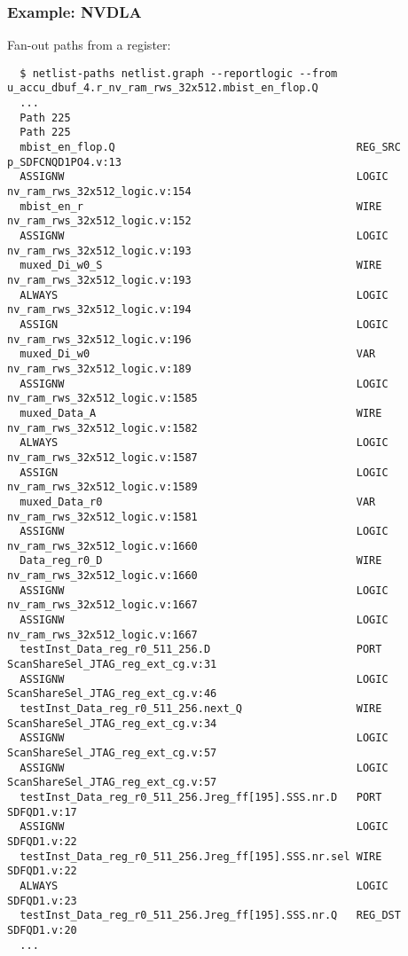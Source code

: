 \documentclass[professionalfonts]{beamer}
\begin{document}
\begin{frame}[fragile]
  \frametitle{Example: NVDLA}
  Fan-out paths from a register:
  \tiny
  \begin{verbatim}
  $ netlist-paths netlist.graph --reportlogic --from u_accu_dbuf_4.r_nv_ram_rws_32x512.mbist_en_flop.Q
  ...
  Path 225
  Path 225
  mbist_en_flop.Q                                      REG_SRC p_SDFCNQD1PO4.v:13
  ASSIGNW                                              LOGIC   nv_ram_rws_32x512_logic.v:154
  mbist_en_r                                           WIRE    nv_ram_rws_32x512_logic.v:152
  ASSIGNW                                              LOGIC   nv_ram_rws_32x512_logic.v:193
  muxed_Di_w0_S                                        WIRE    nv_ram_rws_32x512_logic.v:193
  ALWAYS                                               LOGIC   nv_ram_rws_32x512_logic.v:194
  ASSIGN                                               LOGIC   nv_ram_rws_32x512_logic.v:196
  muxed_Di_w0                                          VAR     nv_ram_rws_32x512_logic.v:189
  ASSIGNW                                              LOGIC   nv_ram_rws_32x512_logic.v:1585
  muxed_Data_A                                         WIRE    nv_ram_rws_32x512_logic.v:1582
  ALWAYS                                               LOGIC   nv_ram_rws_32x512_logic.v:1587
  ASSIGN                                               LOGIC   nv_ram_rws_32x512_logic.v:1589
  muxed_Data_r0                                        VAR     nv_ram_rws_32x512_logic.v:1581
  ASSIGNW                                              LOGIC   nv_ram_rws_32x512_logic.v:1660
  Data_reg_r0_D                                        WIRE    nv_ram_rws_32x512_logic.v:1660
  ASSIGNW                                              LOGIC   nv_ram_rws_32x512_logic.v:1667
  ASSIGNW                                              LOGIC   nv_ram_rws_32x512_logic.v:1667
  testInst_Data_reg_r0_511_256.D                       PORT    ScanShareSel_JTAG_reg_ext_cg.v:31
  ASSIGNW                                              LOGIC   ScanShareSel_JTAG_reg_ext_cg.v:46
  testInst_Data_reg_r0_511_256.next_Q                  WIRE    ScanShareSel_JTAG_reg_ext_cg.v:34
  ASSIGNW                                              LOGIC   ScanShareSel_JTAG_reg_ext_cg.v:57
  ASSIGNW                                              LOGIC   ScanShareSel_JTAG_reg_ext_cg.v:57
  testInst_Data_reg_r0_511_256.Jreg_ff[195].SSS.nr.D   PORT    SDFQD1.v:17
  ASSIGNW                                              LOGIC   SDFQD1.v:22
  testInst_Data_reg_r0_511_256.Jreg_ff[195].SSS.nr.sel WIRE    SDFQD1.v:22
  ALWAYS                                               LOGIC   SDFQD1.v:23
  testInst_Data_reg_r0_511_256.Jreg_ff[195].SSS.nr.Q   REG_DST SDFQD1.v:20
  ...
  \end{verbatim}
\end{frame}
\end{document}
